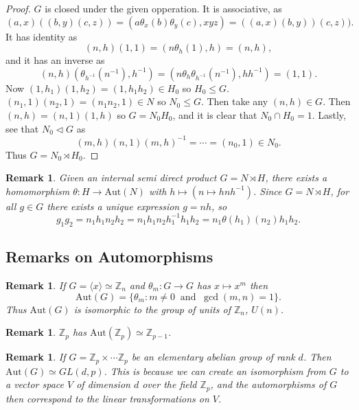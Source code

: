 \documentclass[a4paper,10pt]{article}
\newcommand{\ZZ}{\mathbb{Z}}
\newtheorem{rem}[thm]{Remark}
\begin{document}
\begin{proof}
$G$ is closed under the given opperation. It is associative, as
\[ (a,x) ((b,y) (c,z)) = (a \theta_x (b) \theta_y (c), xyz) = ((a,x)(b,y))(c,z)).\]
It has identity as
\[ (n,h) (1,1) = (n \theta_h(1), h) = (n,h), \]
and it has an inverse as
\[ (n,h)(\theta_{h^{-1}}(n^{-1}), h^{-1}) = (n \theta_h \theta_{h^{-1}} (n^{-1}), hh^{-1} ) = (1,1). \]
Now $(1,h_1) (1,h_2) = (1, h_1h_2) \in H_0$ so $H_0 \leq G$. $(n_1, 1)(n_2, 1) = (n_1n_2, 1) \in N$ so $N_0 \leq G$. Then take any $(n,h) \in G$. Then $(n,h) = (n,1)(1,h)$ so $G = N_0 H_0$, and it is clear that $N_0 \cap H_0 = 1$. Lastly, see that $N_0 \triangleleft G$ as
\[ (m,h) (n,1) (m,h)^{-1} = \cdots = (n_0, 1) \in N_0. \]
Thus $G = N_0 \rtimes H_0$. 

\end{proof}


\begin{rem}
Given an internal semi direct product $G = N \rtimes H$, there exists a homomorphism $\theta : H \rightarrow \text{Aut}(N)$ with $h \mapsto (n \mapsto hnh^{-1})$. Since $G = N \rtimes H$, for all $g \in G$ there exists a unique expression $g = nh$, so
\[ g_1 g_2 = n_1 h_1 n_2 h_2 = n_1 h_1n_2h_1^{-1} h_1 h_2 = n_1 \theta(h_1)(n_2) h_1 h_2. \]
\end{rem}

\subsection{Remarks on Automorphisms}

\begin{rem}
If $G = \langle x \rangle \simeq \ZZ_n$ and $\theta_m : G \rightarrow G$ has $x \mapsto x^m$ then 
\[\text{Aut}(G)= \{ \theta_m : m \neq 0 \ \text{ and } \ \gcd(m,n) = 1 \}. \]
Thus $\text{Aut}(G) $ is isomorphic to the group of units of $\ZZ_n$, $U(n)$. 
\end{rem}

\begin{rem}
$\ZZ_p$ has $\text{Aut}(\ZZ_p) \simeq \ZZ_{p-1}$. 
\end{rem}

\begin{rem}
If $G = \ZZ_p \times \cdots \ZZ_p$ be an elementary abelian group of rank $d$. Then $\text{Aut}(G) \simeq GL(d,p)$.  This is because we can create an isomorphism from $G$ to a vector space $V$ of dimension $d$ over the field $\ZZ_p$, and the automorphisms of $G$ then correspond to the linear transformations on $V$. 
\end{rem}
\end{document}
